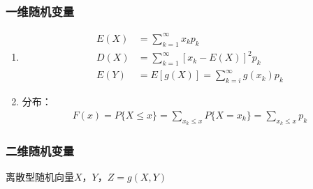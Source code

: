 \documentclass[12pt]{book}
\begin{document}
\subsubsection{一维随机变量}

\begin{enumerate}[1.]
    \item \begin{align*}
        E(X)
        &= \sum_{k=1}^{\infty}{x_{k}p_{k}} \\
        D(X) 
        &= \sum_{k=1}^{\infty}{[x_k - E(X)]^2 p_k} \\
        E(Y) & = E[g(X)] = \sum_{k=i}^{\infty}{ g(x_k) p_k }
    \end{align*}
    \item 分布：
    \begin{gather*}
        F(x) = P\{X\leqslant x\} 
        = \sum_{x_k\leqslant x}{ P\{X=x_k\} }
        = \sum_{x_k\leqslant x}{ p_k } 
    \end{gather*}
\end{enumerate}

\subsubsection{二维随机变量}

离散型随机向量$X$，$Y$，$Z=g(X,Y)$
\end{document}
